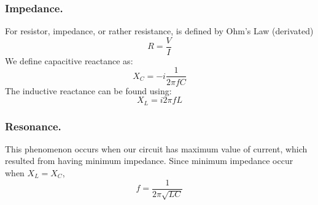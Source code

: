 \documentclass[../../../main.tex]{subfiles}
\begin{document}
\subsubsection*{Impedance.} For resistor, impedance, or rather resistance, is defined by Ohm's Law (derivated) 
\begin{equation*}
    R=\frac{V}{I}
\end{equation*}
We define capacitive reactance as:
\begin{equation*}
    X_C=-i\frac{1}{2\pi fC}
\end{equation*}
The inductive reactance can be found using:
\begin{equation*}
    X_L=i2\pi f L
\end{equation*}

\subsubsection*{Resonance.} This phenomenon occurs when our circuit has maximum value of current, which resulted from having minimum impedance. Since minimum impedance occur when $X_L=X_C$,
\begin{equation*}
    f=\frac{1}{2\pi\sqrt{LC}}
\end{equation*}
\end{document}
